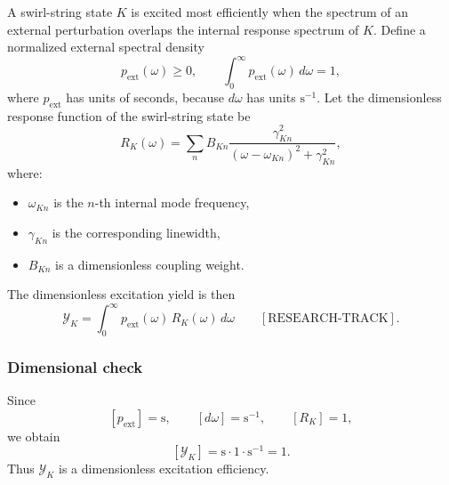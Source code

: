         A swirl-string state \(K\) is excited most efficiently when the spectrum of an external perturbation overlaps the internal response spectrum of \(K\). Define a normalized external spectral density
        \begin{equation}
            p_{\mathrm{ext}}(\omega)\ge 0,
            \qquad
            \int_0^\infty p_{\mathrm{ext}}(\omega)\,d\omega = 1,
            \label{eq:p_ext_normalized}
        \end{equation}
        where \(p_{\mathrm{ext}}\) has units of seconds, because \(d\omega\) has units \(\mathrm{s}^{-1}\). Let the dimensionless response function of the swirl-string state be
        \begin{equation}
            R_K(\omega)
            =
            \sum_{n}
            B_{Kn}
            \frac{\gamma_{Kn}^{2}}
            {(\omega-\omega_{Kn})^{2}+\gamma_{Kn}^{2}},
            \label{eq:RK_lorentzian}
        \end{equation}
        where:
        \begin{itemize}
            \item \(\omega_{Kn}\) is the \(n\)-th internal mode frequency,
            \item \(\gamma_{Kn}\) is the corresponding linewidth,
            \item \(B_{Kn}\) is a dimensionless coupling weight.
        \end{itemize}
        
        The dimensionless excitation yield is then
        \begin{equation}
            \boxed{
                \mathcal{Y}_K
                =
                \int_0^\infty
                p_{\mathrm{ext}}(\omega)\,
                R_K(\omega)\,
                d\omega
            }
            \qquad
            [\mathrm{RESEARCH\text{-}TRACK}].
            \label{eq:SST_resonance_yield}
        \end{equation}
    
    \subsubsection*{Dimensional check}
        
        Since
        \[
            [p_{\mathrm{ext}}]=\mathrm{s},
            \qquad
            [d\omega]=\mathrm{s}^{-1},
            \qquad
            [R_K]=1,
        \]
        we obtain
        \[
            [\mathcal{Y}_K]
            =
            \mathrm{s}\cdot 1 \cdot \mathrm{s}^{-1}
            =
            1.
        \]
        Thus \(\mathcal{Y}_K\) is a dimensionless excitation efficiency.
    
